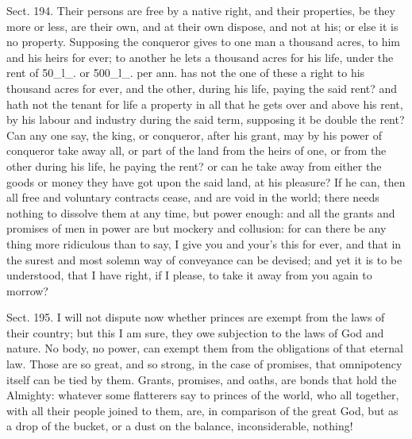 \documentclass[11pt,openany]{book}
\begin{document}
Sect. 194. Their persons are free by a native right, and their properties, be they more or less, are their own, and at their own dispose, and not at his; or else it is no property. Supposing the conqueror gives to one man a thousand acres, to him and his heirs for ever; to another he lets a thousand acres for his life, under the rent of 50\_l\_. or 500\_l\_. per ann. has not the one of these a right to his thousand acres for ever, and the other, during his life, paying the said rent? and hath not the tenant for life a property in all that he gets over and above his rent, by his labour and industry during the said term, supposing it be double the rent? Can any one say, the king, or conqueror, after his grant, may by his power of conqueror take away all, or part of the land from the heirs of one, or from the other during his life, he paying the rent? or can he take away from either the goods or money they have got upon the said land, at his pleasure? If he can, then all free and voluntary contracts cease, and are void in the world; there needs nothing to dissolve them at any time, but power enough: and all the grants and promises of men in power are but mockery and collusion: for can there be any thing more ridiculous than to say, I give you and your's this for ever, and that in the surest and most solemn way of conveyance can be devised; and yet it is to be understood, that I have right, if I please, to take it away from you again to morrow?

Sect. 195. I will not dispute now whether princes are exempt from the laws of their country; but this I am sure, they owe subjection to the laws of God and nature. No body, no power, can exempt them from the obligations of that eternal law. Those are so great, and so strong, in the case of promises, that omnipotency itself can be tied by them. Grants, promises, and oaths, are bonds that hold the Almighty: whatever some flatterers say to princes of the world, who all together, with all their people joined to them, are, in comparison of the great God, but as a drop of the bucket, or a dust on the balance, inconsiderable, nothing!
\end{document}

